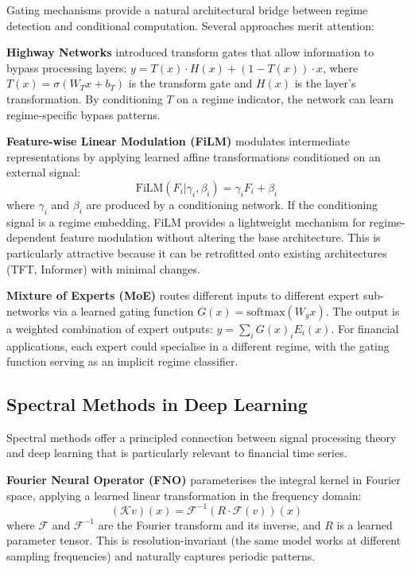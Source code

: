 \documentclass[conference]{IEEEtran}
\begin{document}
Gating mechanisms provide a natural architectural bridge between regime detection and conditional computation. Several approaches merit attention:

\textbf{Highway Networks} \cite{srivastava2015highway} introduced transform gates that allow information to bypass processing layers: $y = T(x) \cdot H(x) + (1 - T(x)) \cdot x$, where $T(x) = \sigma(W_T x + b_T)$ is the transform gate and $H(x)$ is the layer's transformation. By conditioning $T$ on a regime indicator, the network can learn regime-specific bypass patterns.

\textbf{Feature-wise Linear Modulation (FiLM)} \cite{perez2018film} modulates intermediate representations by applying learned affine transformations conditioned on an external signal:
\begin{equation}
\text{FiLM}(F_i | \gamma_i, \beta_i) = \gamma_i F_i + \beta_i
\end{equation}
where $\gamma_i$ and $\beta_i$ are produced by a conditioning network. If the conditioning signal is a regime embedding, FiLM provides a lightweight mechanism for regime-dependent feature modulation without altering the base architecture. This is particularly attractive because it can be retrofitted onto existing architectures (TFT, Informer) with minimal changes.

\textbf{Mixture of Experts (MoE)} \cite{shazeer2017outrageously} routes different inputs to different expert sub-networks via a learned gating function $G(x) = \text{softmax}(W_g x)$. The output is a weighted combination of expert outputs: $y = \sum_i G(x)_i E_i(x)$. For financial applications, each expert could specialise in a different regime, with the gating function serving as an implicit regime classifier.

\subsection{Spectral Methods in Deep Learning}

Spectral methods offer a principled connection between signal processing theory and deep learning that is particularly relevant to financial time series.

\textbf{Fourier Neural Operator (FNO)} \cite{li2020fourier} parameterises the integral kernel in Fourier space, applying a learned linear transformation in the frequency domain:
\begin{equation}
(\mathcal{K} v)(x) = \mathcal{F}^{-1}\!\left(R \cdot \mathcal{F}(v)\right)(x)
\end{equation}
where $\mathcal{F}$ and $\mathcal{F}^{-1}$ are the Fourier transform and its inverse, and $R$ is a learned parameter tensor. This is resolution-invariant (the same model works at different sampling frequencies) and naturally captures periodic patterns.
\end{document}
